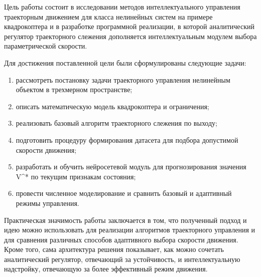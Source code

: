 Цель работы состоит в исследовании методов интеллектуального управления траекторным движением для класса нелинейных систем на примере квадрокоптера и в разработке программной реализации, в которой аналитический регулятор траекторного слежения дополняется интеллектуальным модулем выбора параметрической скорости.

Для достижения поставленной цели были сформулированы следующие задачи:
\begin{enumerate}
    \item рассмотреть постановку задачи траекторного управления нелинейным объектом в трехмерном пространстве;
    \item описать математическую модель квадрокоптера и ограничения;
    \item реализовать базовый алгоритм траекторного слежения по выходу;
    \item подготовить процедуру формирования датасета для подбора допустимой скорости движения;
    \item разработать и обучить нейросетевой модуль для прогнозирования значения V^* по текущим признакам состояния;
    \item провести численное моделирование и сравнить базовый и адаптивный режимы управления.
\end{enumerate}

Практическая значимость работы заключается в том, что полученный подход и идею можно использовать для реализации алгоритмов траекторного управления и для сравнения различных способов адаптивного выбора скорости движения.
Кроме того, сама архитектура решения показывает, как можно сочетать аналитический регулятор, отвечающий за устойчивость, и интеллектуальную надстройку, отвечающую за более эффективный режим движения.
